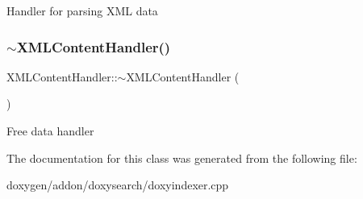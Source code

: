 Handler for parsing X\+ML data \mbox{\label{class_x_m_l_content_handler_aab56a9676e4ac4502553a00b750018a0}} 
\subsubsection{\texorpdfstring{$\sim$XMLContentHandler()}{~XMLContentHandler()}}
{\footnotesize\ttfamily X\+M\+L\+Content\+Handler\+::$\sim$\+X\+M\+L\+Content\+Handler (\begin{DoxyParamCaption}{ }\end{DoxyParamCaption})\hspace{0.3cm}{\ttfamily [inline]}}

Free data handler 

The documentation for this class was generated from the following file\+:\begin{DoxyCompactItemize}
\item 
doxygen/addon/doxysearch/doxyindexer.\+cpp\end{DoxyCompactItemize}
